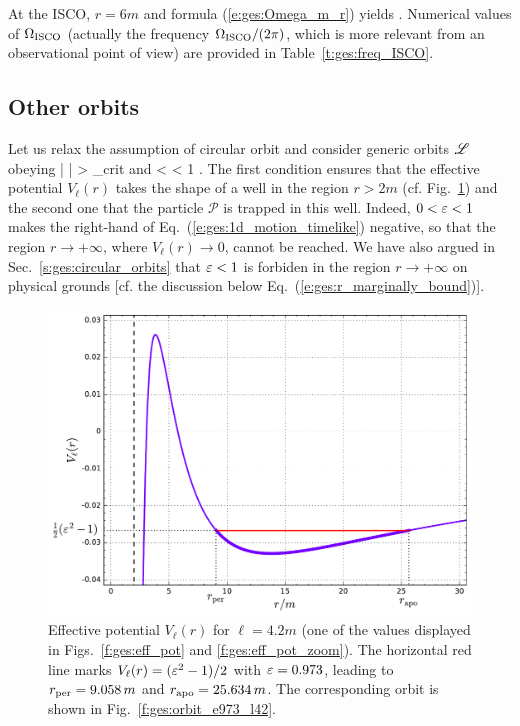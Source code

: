 At the ISCO, $r=6m$ and formula (\ref{e:ges:Omega_m_r}) yields
\be
     .
\ee
Numerical values of $\Omega_{\rm ISCO}$ (actually the frequency $\Omega_{\rm ISCO}/(2\pi)$,
which is more relevant from an observational point of view) are provided in
Table~\ref{t:ges:freq_ISCO}.

\subsection{Other orbits}

Let us relax the assumption of circular orbit and consider generic orbits $\mathscr{L}$
obeying
\be
    | \ell | > \ell_{\rm crit} \qquad\mbox{and} < \veps < 1 .
\ee
The first condition ensures that the effective potential $V_{\ell}(r)$
takes the shape of a well in the region $r>2m$ (cf. Fig.~\ref{f:ges:eff_pot_bound})
and the second one that the particle $\mathscr{P}$ is trapped in this well.
Indeed, $0 < \varepsilon < 1$  makes the right-hand of Eq.~(\ref{e:ges:1d_motion_timelike}) negative, so
that the region $r\rightarrow +\infty$, where $V_{\ell}(r)\rightarrow 0$,
cannot be reached. We have also argued in Sec.~\ref{s:ges:circular_orbits}
that $\varepsilon < 1$ is forbiden in the region $r\rightarrow +\infty$ on physical
grounds [cf. the discussion below Eq.~(\ref{e:ges:r_marginally_bound})].

\begin{figure}
\centerline{\includegraphics[height=0.4\textheight]{ges_eff_pot_bound.pdf}}
\caption[]{\label{f:ges:eff_pot_bound} \footnotesize
Effective potential $V_{\ell}(r)$ for $\ell = 4.2 m$ (one of the values displayed
in Figs.~\ref{f:ges:eff_pot}  and \ref{f:ges:eff_pot_zoom}).
The horizontal red line marks $V_{\ell}(r) = (\varepsilon^2-1)/2$
with $\varepsilon = 0.973$, leading to $r_{\rm per} = 9.058\, m$ and $r_{\rm apo} = 25.634\, m$.
The corresponding orbit is shown in Fig.~\ref{f:ges:orbit_e973_l42}.
}
\end{figure}

